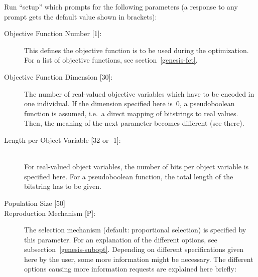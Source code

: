Run ``setup'' which prompts for the following  parameters
(a   response to any prompt gets the default value shown
in brackets):
%
\begin{description}
%
\item[	Objective Function Number {[1]}:]			
	This defines the objective function is to be used during the
	optimization.
	For a list of objective functions, see section~\ref{genesis-fct}.      	
%
\item[	Objective Function Dimension {[30]}:]
	The number of real-valued objective va\-ri\-a\-bles which have to be
	encoded in one individual.
	If the dimension specified here is~$0$, a pseudoboolean function is
	assumed, i.e.~a direct mapping of bitstrings to real values.
	Then, the meaning of the next parameter becomes different (see there).
%
\item[	Length per Object Variable {[32 or -1]}:]
	\ifUS
	\mbox{}\\
	\fi
	For real-valued object variables, the number of bits per object
	variable is specified here.
	For a pseudoboolean function, the total length of the bitstring has
	to be given.
%
\item[	Population Size {[50]}]{}
%
\item[ 	Reproduction Mechanism {[P]}:]
	The selection mechanism (default: proportional selection) is
	specified by this parameter.
	For an explanation of the different options, see 
	subsection~\ref{genesis-subopt}.
	Depending on different specifications given here by the user,
	some more information might be necessary. 
	The different options causing more information requests are explained
	here briefly:
\end{description}
